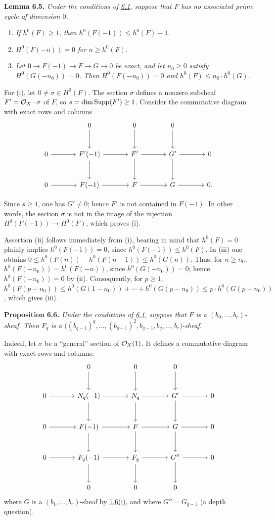 \textbf{Lemma 6.5.} \emph{Under the conditions of \hyperlink{sga6.e13.para.6-1}{6.1}, suppose that $F$
has no associated prime cycle of dimension $0$.}
\begin{enumerate}[label=(\roman*)]
\item \emph{If $h^0(F)\geq1$, then $h^0(F(-1))\leq h^0(F)-1$.}
\item \emph{$H^0(F(-n))=0$ for $n\geq h^0(F)$.}
\item \emph{Let $0\to F(-1)\to F\to G\to0$ be exact, and let
$n_0\geq0$ satisfy $H^0(G(-n_0))=0$. Then $H^0(F(-n_0))=0$ and
$h^0(F)\leq n_0\cdot h^0(G)$.}
\end{enumerate}

For (i), let $0\ne\sigma\in H^0(F)$. The section $\sigma$ defines a nonzero subsheaf $F'=\mathcal O_X\cdot\sigma$ of $F$, so $s=\dim\operatorname{Supp}(F')\geq1$. Consider the commutative diagram with exact rows and columns
\[
\begin{tikzcd}[column sep=large,row sep=large]
&0 \arrow[d]&0 \arrow[d]&0 \arrow[d]&\\
0 \arrow[r]&F'(-1) \arrow[r] \arrow[d]&F' \arrow[r] \arrow[d]&G' \arrow[r] \arrow[d]&0\\
0 \arrow[r]&F(-1) \arrow[r]&F \arrow[r]&G \arrow[r]&0.
\end{tikzcd}
\]

Since $s\geq1$, one has $G'\ne0$; hence $F'$ is not contained in $F(-1)$. In other words, the section $\sigma$ is not in the image of the injection $H^0(F(-1))\to H^0(F)$, which proves (i).

Assertion (ii) follows immediately from (i), bearing in mind that
$h^0(F)=0$ plainly implies $h^0(F(-1))=0$, since
$h^0(F(-1))\leq h^0(F)$. In (iii) one obtains
$0\leq h^0(F(n))-h^0(F(n-1))\leq h^0(G(n))$.
Thus, for $n\geq n_0$, $h^0(F(-n_0))=h^0(F(-n))$, since $h^0(G(-n_0))=0$; hence $h^0(F(-n_0))=0$ by (ii). Consequently, for $p\geq1$,
$h^0(F(p-n_0))
\leq h^0(G(1-n_0))+\cdots+h^0(G(p-n_0))
\leq p\cdot h^0(G(p-n_0))$,
which gives (iii).

\textbf{Proposition 6.6.} \emph{Under the conditions of \hyperlink{sga6.e13.para.6-1}{6.1}, suppose
that $F$ is a $(b_0,\ldots,b_r)$-sheaf. Then $F_q$ is a
$\bigl((b_{q-1})^q,\ldots,(b_{q-1})^2,b_{q-1},b_q,\ldots,b_r\bigr)$-sheaf.}

Indeed, let $\sigma$ be a ``general'' section of $\mathcal O_X(1)$. It defines a commutative diagram with exact rows and columns:
\[
\begin{tikzcd}[column sep=large,row sep=large]
&0 \arrow[d]&0 \arrow[d]&0 \arrow[d]&\\
0 \arrow[r]&N_q(-1) \arrow[r] \arrow[d]&N_q \arrow[r] \arrow[d]&G' \arrow[r] \arrow[d]&0\\
0 \arrow[r]&F(-1) \arrow[r] \arrow[d]&F \arrow[r] \arrow[d]&G \arrow[r] \arrow[d]&0\\
0 \arrow[r]&F_q(-1) \arrow[r] \arrow[d]&F_q \arrow[r] \arrow[d]&G'' \arrow[r] \arrow[d]&0\\
&0&0&0&
\end{tikzcd}
\]
where $G$ is a $(b_1,\ldots,b_r)$-sheaf by \hyperlink{sga6.e13.prop.1-6}{1.6(i)}, and where
$G''=G_{q-1}$ (a depth question).

